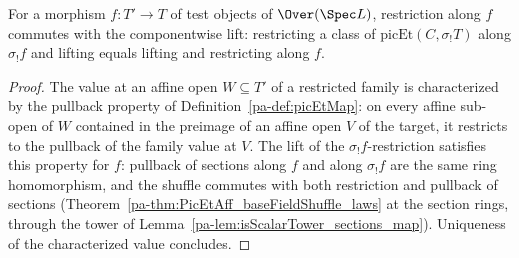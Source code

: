 \begin{theorem}
  \label{pa-thm:picEtMap_picEtCrossBase}
  \leanok

  For a morphism \(f \colon T' \to T\) of test objects of \(\Over(\Spec L)\),
  restriction along \(f\) commutes with the componentwise lift:
  restricting a class of \(\mathrm{picEt}(C, \sigma_{!}T)\) along
  \(\sigma_{!}f\) and lifting equals lifting and restricting along \(f\).
\end{theorem}
\begin{proof}
  \leanok
  The value at an affine open \(W \subseteq T'\) of a restricted family is
  characterized by the pullback property of Definition~\ref{pa-def:picEtMap}: on every
  affine sub-open of \(W\) contained in the preimage of an affine open \(V\) of the
  target, it restricts to the pullback of the family value at \(V\).  The lift of the
  \(\sigma_{!}f\)-restriction satisfies this property for \(f\): pullback of sections
  along \(f\) and along \(\sigma_{!}f\) are the same ring homomorphism, and the
  shuffle commutes with both restriction and pullback of sections
  (Theorem~\ref{pa-thm:PicEtAff_baseFieldShuffle_laws} at the section rings, through the
  tower of Lemma~\ref{pa-lem:isScalarTower_sections_map}).  Uniqueness of the
  characterized value concludes.
\end{proof}

